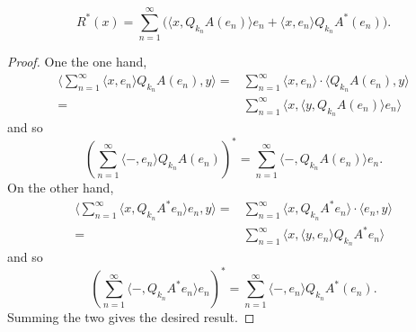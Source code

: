 \documentclass[12pt]{article}
\begin{document}
\begin{proposition}
\label{prop_r_adjoint}
	\begin{equation*}
		R^\ast(x) = \sum_{n=1}^\infty \big( \langle x, Q_{k_n}A(e_n) \rangle e_n + \langle x, e_n \rangle Q_{k_n}A^\ast (e_n) \Big).
	\end{equation*}
\end{proposition}
\begin{proof}
	One the one hand, 
	\begin{align*}
		\langle \sum_{n=1}^\infty \langle x, e_n \rangle Q_{k_n}A(e_n), y \rangle
		=& \sum_{n=1}^\infty \langle x, e_n \rangle \cdot \langle Q_{k_n}A(e_n), y \rangle \\
		=& \sum_{n=1}^\infty \langle x, \langle y, Q_{k_n}A(e_n) \rangle e_n \rangle
	\end{align*}
	and so 
	\begin{equation*}
		\left( \sum_{n=1}^\infty \langle -, e_n \rangle Q_{k_n}A(e_n) \right)^\ast = \sum_{n=1}^\infty \langle -, Q_{k_n}A(e_n) \rangle e_n.
	\end{equation*}
	On the other hand,
	\begin{align*}
		\langle \sum_{n=1}^\infty \langle x, Q_{k_n}A^\ast e_n \rangle e_n, y \rangle
		=& \sum_{n=1}^\infty \langle x, Q_{k_n}A^\ast e_n \rangle \cdot \langle e_n, y \rangle \\
		=& \sum_{n=1}^\infty \langle x, \langle y, e_n \rangle Q_{k_n}A^\ast e_n \rangle
	\end{align*}
	and so 
	\begin{equation*}
		\left(\sum_{n=1}^\infty \langle -, Q_{k_n}A^\ast e_n\rangle e_n \right)^\ast = \sum_{n=1}^\infty \langle -, e_n \rangle Q_{k_n}A^\ast (e_n).
	\end{equation*}
	Summing the two gives the desired result.
\end{proof}
\end{document}
